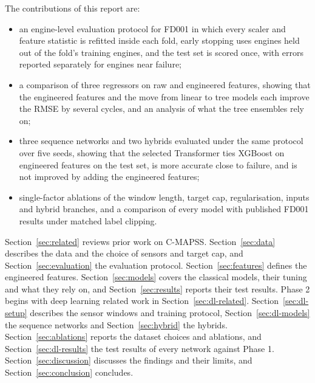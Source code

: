 The contributions of this report are:
\begin{itemize}
\item an engine-level evaluation protocol for FD001 in which every scaler
and feature statistic is refitted inside each fold, early stopping uses
engines held out of the fold's training engines, and the test set is scored
once, with errors reported separately for engines near failure;
\item a comparison of three regressors on raw and engineered features,
showing that the engineered features and the move from linear to tree
models each improve the RMSE by several cycles, and an analysis of what the
tree ensembles rely on;
\item three sequence networks and two hybrids evaluated under the same
protocol over five seeds, showing that the selected Transformer ties
XGBoost on engineered features on the test set, is more accurate close to
failure, and is not improved by adding the engineered features;
\item single-factor ablations of the window length, target cap,
regularisation, inputs and hybrid branches, and a comparison of every model
with published FD001 results under matched label clipping.
\end{itemize}

Section~\ref{sec:related} reviews prior work on C-MAPSS.
Section~\ref{sec:data} describes the data and the choice of sensors and
target cap, and Section~\ref{sec:evaluation} the evaluation protocol.
Section~\ref{sec:features} defines the engineered features.
Section~\ref{sec:models} covers the classical models, their tuning and what
they rely on, and Section~\ref{sec:results} reports their test results.
Phase 2 begins with deep learning related work in
Section~\ref{sec:dl-related}. Section~\ref{sec:dl-setup} describes the
sensor windows and training protocol, Section~\ref{sec:dl-models} the
sequence networks and Section~\ref{sec:hybrid} the hybrids.
Section~\ref{sec:ablations} reports the dataset choices and ablations, and
Section~\ref{sec:dl-results} the test results of every network against
Phase 1. Section~\ref{sec:discussion} discusses the findings and their
limits, and Section~\ref{sec:conclusion} concludes.
